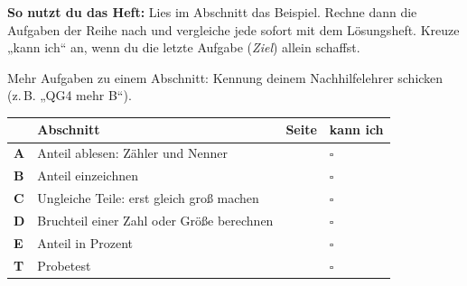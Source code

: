 \documentclass[11pt]{article}
\begin{document}
\par\smallskip
{}\par\medskip
\noindent\textbf{So nutzt du das Heft:} Lies im Abschnitt das Beispiel. Rechne dann die Aufgaben der Reihe nach und vergleiche jede sofort mit dem Lösungsheft. Kreuze „kann ich“ an, wenn du die letzte Aufgabe (\emph{Ziel}) allein schaffst.\par
\noindent Mehr Aufgaben zu einem Abschnitt: Kennung deinem Nachhilfelehrer schicken (z.\,B. „QG4 mehr B“).\par\medskip
{\renewcommand{\arraystretch}{1.3}
\noindent\begin{tabular}{|>{\bfseries}p{10mm}|p{112mm}|>{\raggedleft\arraybackslash}p{10mm}|>{\centering\arraybackslash}p{14mm}|}\hline
\rowcolor{black!8} & \textbf{Abschnitt} & \textbf{Seite} & \textbf{kann ich}\\\hline
A & Anteil ablesen: Zähler und Nenner & \pageref{s:A} & $\square$\\\hline
B & Anteil einzeichnen & \pageref{s:B} & $\square$\\\hline
C & Ungleiche Teile: erst gleich groß machen & \pageref{s:C} & $\square$\\\hline
D & Bruchteil einer Zahl oder Größe berechnen & \pageref{s:D} & $\square$\\\hline
E & Anteil in Prozent & \pageref{s:E} & $\square$\\\hline
T & Probetest & \pageref{s:T} & $\square$\\\hline
\end{tabular}}\par\bigskip
\end{document}
